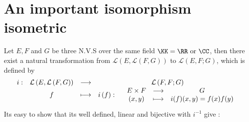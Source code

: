 % 
% 

\lecday[2025-03-06]

% 

\section{An important isomorphism isometric}

Let $E,F$ and $G $ be three N.V.S over the same 
field $\KK = \RR  \text{ or }  \CC  $, then there exist
a natural transformation from 
$\mathcal{L}(E, \mathcal{L} (F,G)) $  to 
$\mathcal{L} \left( E,F ;G \right) $, which is defined
by 
\[
\begin{array}{cccc}
      i : &  \mathcal{L} 
	  \left( E, \mathcal{L} 
\left( F,G \right)\right)& \longrightarrow & 
\mathcal{L} \left( F,F ; G \right)\\

           &  f  & \longmapsto     & 
	   i \left( f \right) : 
	   \vspace{2pt}
	   \begin{array}{cccc}
	            &  
		  E \times F & \longrightarrow & 
		  G \\
	              & (x,y)     & \longmapsto     &
		      i(f) (x,y) = 
		      f(x)  f(y) \\ 
	   \end{array}
	   \\ 
\end{array}
\]
Its easy to show that its well defined, linear and
bijective with $i^{-1} $ give :

